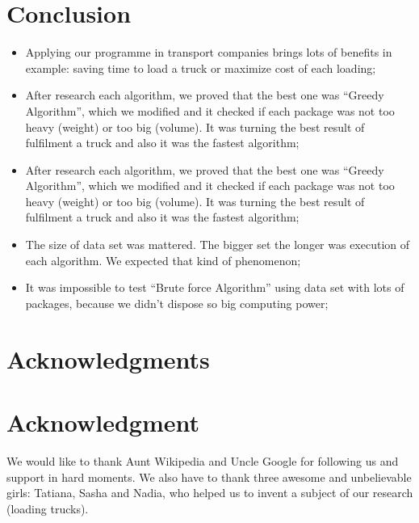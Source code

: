 \documentclass[conference,compsoc]{IEEEtran}
\begin{document}
\section{Conclusion}
\begin{itemize}
\item Applying our programme in transport companies brings lots of benefits in example: saving time to load a truck or maximize cost of each loading;

\item After research each algorithm, we proved that the best one was “Greedy Algorithm”, which we modified and it checked if each package was not too heavy (weight) or too big (volume). It was turning the best result of fulfilment a truck and also it was the fastest algorithm;

\item After research each algorithm, we proved that the best one was “Greedy Algorithm”, which we modified and it checked if each package was not too heavy (weight) or too big (volume). It was turning the best result of fulfilment a truck and also it was the fastest algorithm;

\item The size of data set was mattered. The bigger set the longer was execution of each algorithm. We expected that kind of phenomenon;

\item It was impossible to test “Brute force Algorithm” using data set with lots of packages, because we didn't dispose so big computing power;

\end{itemize}




\ifCLASSOPTIONcompsoc
  \section*{Acknowledgments}
\else
  \section*{Acknowledgment}
\fi

We would like to thank Aunt Wikipedia and Uncle Google for following us and support in hard moments. We also have to thank three awesome and unbelievable girls: Tatiana, Sasha and Nadia, who helped us to invent a subject of our research (loading trucks). 
\end{document}
